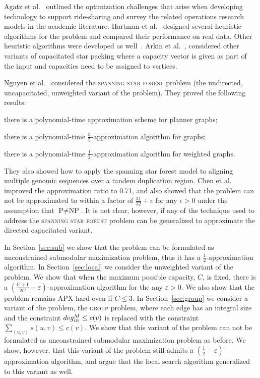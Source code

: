 Agatz et al.~\cite{agatz2012optimization} outlined the optimization challenges
that arise when developing technology to support ride-sharing and survey the
related operations research models in the academic literature.  
Hartman et al.~\cite{hartman2014theory} designed several heuristic algorithms
for the \CARPOOL{} problem and compared 
their performance on real data.
Other heuristic algorithms were developed as well~\cite{knapen2014exploiting}.
Arkin et al.~\cite{arkin2004approximations}, considered other variants of
capacitated star packing where a capacity vector is given as part of the input and 
capacities need to be assigned to vertices.  

Nguyen et al.~\cite{nguyen2008approximating} considered the \textsc{spanning star forest} problem
(the undirected, uncapacitated, unweighted variant of the problem).
They proved the following results:
\begin{enumerate*}
\item
there is a polynomial-time approximation scheme for planner graphs;
\item 
there is a polynomial-time $\frac{3}{5}$-approximation algorithm for graphs;
\item 
there is a polynomial-time $\frac{1}{2}$-approximation algorithm for weighted graphs.
\end{enumerate*}
They also showed how to apply the spanning star forest model to aligning multiple
genomic sequences over a tandem duplication region.
Chen et al.~\cite{chen2007improved} improved the approximation ratio to 0.71,
and also showed that the problem can not be approximated to within a factor of
$\frac{31}{32} + \epsilon$ for any $\epsilon > 0$ under the assumption 
that $\text{P} \neq \text{NP}$.
It is not clear, however, if any of the technique used to address the
\textsc{spanning star forest} problem can be generalized to approximate the
directed capacitated variant.

In Section~\ref{sec:sub} we show that the problem can be formulated as
unconstrained submodular maximization problem, thus it has a
$\frac{1}{2}$-approximation algorithm.
In Section~\ref{sec:local} we consider the unweighted variant of the problem.
We show that when the maximum possible capacity, $C$, is fixed, there is a 
$(\frac{C + 1}{2C} - \varepsilon)$-approximation algorithm for the any $\varepsilon > 0$.
We also show that the problem remains APX-hard even if $C \leq 3$.
In Section~\ref{sec:group} we consider a variant of the problem, the
\textsc{group \CARPOOL} problem, where each edge has an integral size and 
the constraint $\din[M] \leq c(v)$ is replaced with the constraint
$\sum_{(u,v)}s(u,v) \leq c(v)$.
We show that this variant of the problem can not be formulated as unconstrained
submodular maximization problem as before.
We show, however, that this variant of the problem still admits a
$(\frac{1}{2} - \varepsilon)$-approximation algorithm, and argue that the local
search algorithm generalized to this variant as well.
